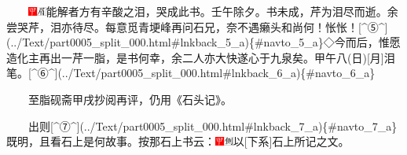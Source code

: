 　　{\includegraphics[width=3mm]{../Images/00002}\includegraphics[width=3mm]{../Images/00010}\footnotesize  能解者方有辛酸之泪，哭成此书。壬午除夕。书未成，芹为泪尽而逝。余尝哭芹，泪亦待尽。每意觅青埂峰再问石兄，奈不遇癞头和尚何！怅怅！}{[}\^{}⑤\^{}{]}(../Text/part0005\_split\_000.html\#lnkback\_5\_a)\{\#navto\_5\_a\}{{◇今而后，惟愿造化主再出一芹一脂，是书何幸，余二人亦大快遂心于九泉矣。甲午八{(日)}{[}月{]}泪笔。}}{[}\^{}⑥\^{}{]}(../Text/part0005\_split\_000.html\#lnkback\_6\_a)\{\#navto\_6\_a\}

　　至脂砚斋甲戌抄阅再评，仍用《石头记》。

　　出则{[}\^{}⑦\^{}{]}(../Text/part0005\_split\_000.html\#lnkback\_7\_a)\{\#navto\_7\_a\}既明，且看石上是何故事。按那石上书云：{\includegraphics[width=3mm]{../Images/00002}\includegraphics[width=3mm]{../Images/00011}\footnotesize 以{[}下系{]}石上所记之文。}

